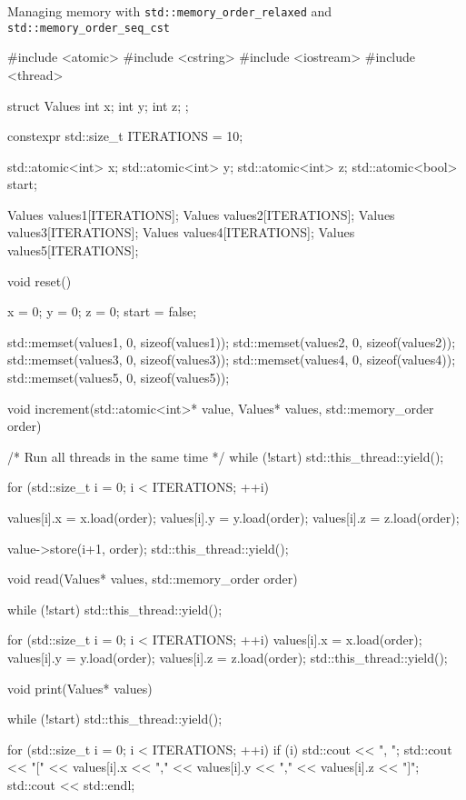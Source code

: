 \documentclass[../main]{subfiles}
\begin{document}
    Managing memory with \texttt{std::memory\_order\_relaxed} and \texttt{std::memory\_order\_seq\_cst}
\begin{Code}
    #include <atomic>
    #include <cstring>
    #include <iostream>
    #include <thread>

    struct Values
    {
        int x;
        int y;
        int z;
    };

    constexpr std::size_t ITERATIONS = 10;

    std::atomic<int> x;
    std::atomic<int> y;
    std::atomic<int> z;
    std::atomic<bool> start;

    Values values1[ITERATIONS];
    Values values2[ITERATIONS];
    Values values3[ITERATIONS];
    Values values4[ITERATIONS];
    Values values5[ITERATIONS];

    void reset()
    {
        x = 0;
        y = 0;
        z = 0;
        start = false;

        std::memset(values1, 0, sizeof(values1));
        std::memset(values2, 0, sizeof(values2));
        std::memset(values3, 0, sizeof(values3));
        std::memset(values4, 0, sizeof(values4));
        std::memset(values5, 0, sizeof(values5));
    }

    void increment(std::atomic<int>* value,
                   Values* values,
                   std::memory_order order)
    {
        /* Run all threads in the same time */
        while (!start)
        {
            std::this_thread::yield();
        }

        for (std::size_t i = 0; i < ITERATIONS; ++i)
        {
            values[i].x = x.load(order);
            values[i].y = y.load(order);
            values[i].z = z.load(order);

            value->store(i+1, order);
            std::this_thread::yield();
        }
    }

    void read(Values* values, std::memory_order order)
    {
        while (!start)
        {
            std::this_thread::yield();
        }

        for (std::size_t i = 0; i < ITERATIONS; ++i)
        {
            values[i].x = x.load(order);
            values[i].y = y.load(order);
            values[i].z = z.load(order);
            std::this_thread::yield();
        }

    }

    void print(Values* values)
    {
        while (!start)
        {
            std::this_thread::yield();
        }

        for (std::size_t i = 0; i < ITERATIONS; ++i)
        {
            if (i)
            {
                std::cout << ", ";
            }
            std::cout << "[" << values[i].x
                      << "," << values[i].y
                      << "," << values[i].z
                      << "]";
        }
        std::cout << std::endl;
    }


\end{Code}
\end{document}
